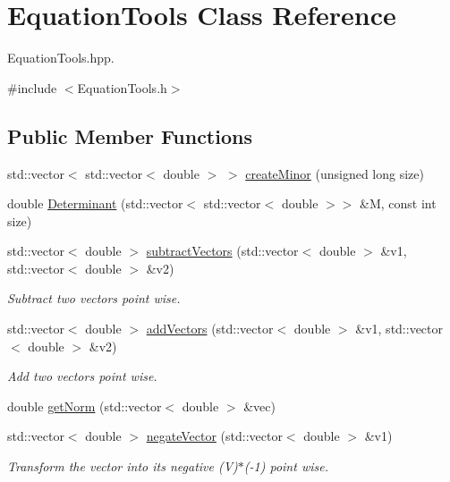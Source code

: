 \hypertarget{class_equation_tools}{}\section{Equation\+Tools Class Reference}
\label{class_equation_tools}


Equation\+Tools.\+hpp.  




{\ttfamily \#include $<$Equation\+Tools.\+h$>$}

\subsection*{Public Member Functions}
\begin{DoxyCompactItemize}
\item 
std\+::vector$<$ std\+::vector$<$ double $>$ $>$ \hyperlink{class_equation_tools_a1c4fc9f9b40d7951d2507f4519f78bc2}{create\+Minor} (unsigned long size)
\item 
double \hyperlink{class_equation_tools_a6bf149cf279a8fe4ab3b8759b4493878}{Determinant} (std\+::vector$<$ std\+::vector$<$ double $>$$>$ \&M, const int size)
\item 
std\+::vector$<$ double $>$ \hyperlink{class_equation_tools_a54bd03c010750aa6686253bcec951c88}{subtract\+Vectors} (std\+::vector$<$ double $>$ \&v1, std\+::vector$<$ double $>$ \&v2)
\begin{DoxyCompactList}\small\item\em Subtract two vectors point wise. \end{DoxyCompactList}\item 
std\+::vector$<$ double $>$ \hyperlink{class_equation_tools_aae5459f604226de23ee6d9682f2aade8}{add\+Vectors} (std\+::vector$<$ double $>$ \&v1, std\+::vector$<$ double $>$ \&v2)
\begin{DoxyCompactList}\small\item\em Add two vectors point wise. \end{DoxyCompactList}\item 
double \hyperlink{class_equation_tools_a4f34553fca5396a6bdb77bc265e7ddb7}{get\+Norm} (std\+::vector$<$ double $>$ \&vec)
\item 
std\+::vector$<$ double $>$ \hyperlink{class_equation_tools_a8f8c215f13782636f54dc3a2b2bfc136}{negate\+Vector} (std\+::vector$<$ double $>$ \&v1)
\begin{DoxyCompactList}\small\item\em Transform the vector into its negative (V)$\ast$(-\/1) point wise. \end{DoxyCompactList}\end{DoxyCompactItemize}
